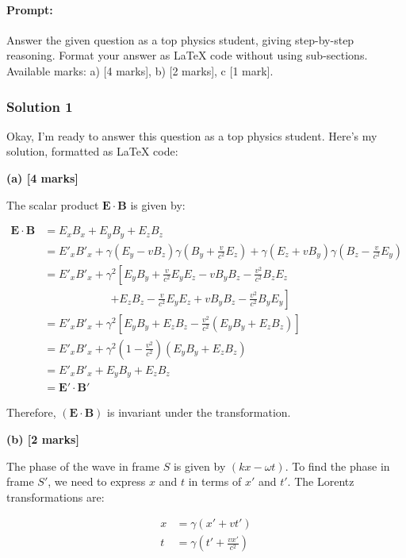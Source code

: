 \documentclass{article}
\begin{document}
\paragraph{Prompt: \\} 
Answer the given question as a top physics student, giving step-by-step reasoning. Format your answer as LaTeX code without using sub-sections. Available marks: a) [4 marks], b) [2 marks], c [1 mark].

\subsubsection{Solution 1}
Okay, I'm ready to answer this question as a top physics student. Here's my solution, formatted as LaTeX code:

\textbf{(a) [4 marks]}

The scalar product $\mathbf{E} \cdot \mathbf{B}$ is given by:

\begin{align*}
\mathbf{E} \cdot \mathbf{B} &= E_x B_x + E_y B_y + E_z B_z \\
&= E'_x B'_x + \gamma (E_y - v B_z) \gamma \left( B_y + \frac{v}{c^2} E_z \right) + \gamma (E_z + v B_y) \gamma \left( B_z - \frac{v}{c^2} E_y \right) \\
&= E'_x B'_x + \gamma^2 \left[ E_y B_y + \frac{v}{c^2} E_y E_z - v B_y B_z - \frac{v^2}{c^2} B_z E_z  \right. \\
&\qquad \qquad \qquad \left. + E_z B_z - \frac{v}{c^2} E_y E_z + v B_y B_z - \frac{v^2}{c^2} B_y E_y \right] \\
&= E'_x B'_x + \gamma^2 \left[ E_y B_y + E_z B_z - \frac{v^2}{c^2} (E_y B_y + E_z B_z) \right] \\
&= E'_x B'_x + \gamma^2 \left( 1 - \frac{v^2}{c^2} \right) (E_y B_y + E_z B_z) \\
&= E'_x B'_x + E_y B_y + E_z B_z \\
&= \mathbf{E'} \cdot \mathbf{B'}
\end{align*}

Therefore, $(\mathbf{E} \cdot \mathbf{B})$ is invariant under the transformation.

\textbf{(b) [2 marks]}

The phase of the wave in frame $S$ is given by $(kx - \omega t)$.  To find the phase in frame $S'$, we need to express $x$ and $t$ in terms of $x'$ and $t'$. The Lorentz transformations are:

\begin{align*}
x &= \gamma (x' + vt') \\
t &= \gamma \left( t' + \frac{v x'}{c^2} \right)
\end{align*}
\end{document}

